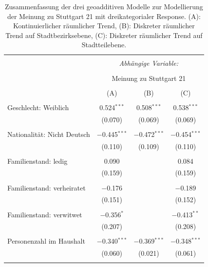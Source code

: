 \documentclass{Vorlage}
\begin{document}
\begin{appendix}
\clearpage

\begin{table}[h] \centering 
  \caption{Zusammenfassung der drei geoadditiven Modelle zur Modellierung der Meinung zu Stuttgart 21 mit dreikategorialer Response. (A): Kontinuierlicher räumlicher Trend, (B): Diskreter räumlicher Trend auf Stadtbezirksebene, (C): Diskreter räumlicher Trend auf Stadtteilebene.} 
  \label{ParameterTabS213spat} 
\begin{tabular}{@{\extracolsep{5pt}}lccc} 
\\[-1.8ex]\hline 
\hline \\[-1.8ex] 
 & \multicolumn{3}{c}{\textit{Abhängige Variable:}} \\ 
\cline{2-4} 
\\[-1.8ex] & \multicolumn{3}{c}{Meinung zu Stuttgart 21} \\ 
\\[-1.8ex] & (A) & (B) & (C)\\ 
\hline \\[-1.8ex] 
 Geschlecht: Weiblich & 0.524$^{***}$ & 0.508$^{***}$ & 0.538$^{***}$ \\ 
  & (0.070) & (0.069) & (0.069) \\ 
  & & & \\ 
 Nationalität: Nicht Deutsch & $-$0.445$^{***}$ & $-$0.472$^{***}$ & $-$0.454$^{***}$ \\ 
  & (0.110) & (0.109) & (0.110) \\ 
  & & & \\ 
 Familienstand: ledig & 0.090 &  & 0.084 \\ 
  & (0.159) &  & (0.159) \\ 
  & & & \\ 
 Familienstand: verheiratet & $-$0.176 &  & $-$0.189 \\ 
  & (0.151) &  & (0.152) \\ 
  & & & \\ 
 Familienstand: verwitwet & $-$0.356$^{*}$ &  & $-$0.413$^{**}$ \\ 
  & (0.207) &  & (0.208) \\ 
  & & & \\ 
 Personenzahl im Haushalt & $-$0.340$^{***}$ & $-$0.369$^{***}$ & $-$0.348$^{***}$ \\ 
  & (0.060) & (0.021) & (0.061) \\ 
  & & & \\ \hline

\end{tabular}
\end{table}
\end{appendix}
\end{document}
